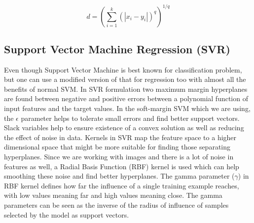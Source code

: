 \begin{equation}
\label{eq:minkowski_distance}
d = (\sum_{i=1}^{k} (|x_i - y_i|)^{q})^{1/q}
\end{equation}

\subsection{Support Vector Machine Regression (SVR)}
Even though Support Vector Machine\cite{svm_r} is best known for classification problem, but one can use a modified version of that for regression too with almost all the benefits of normal SVM. In SVR formulation two maximum margin hyperplanes are found between negative and positive errors between a polynomial function of input features and the target values. In the soft-margin SVM which we are using, the $\epsilon$ parameter helps to tolerate small errors and find better support vectors. Slack variables help to ensure existence of a convex solution as well as reducing the effect of noise in data. Kernels in SVR map the feature space to a higher dimensional space that might be more suitable for finding those separating hyperplanes. Since we are working with images and there is a lot of noise in features as well, a Radial Basis Function (RBF) kernel is used which can help smoothing these noise and find better hyperplanes. The gamma parameter ($\gamma$) in RBF kernel defines how far the influence of a single training example reaches, with low values meaning far and high values meaning close. The gamma parameters can be seen as the inverse of the radius of influence of samples selected by the model as support vectors.



